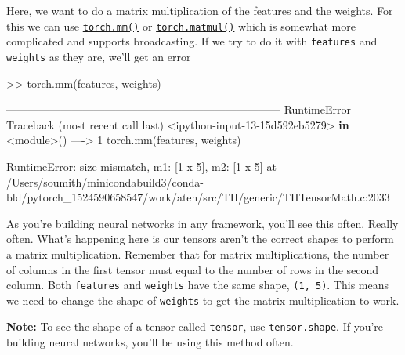 \documentclass[11pt]{article}
\newenvironment{Shaded}{}{}
\newcommand{\KeywordTok}[1]{\textcolor[rgb]{0.00,0.44,0.13}{\textbf{{#1}}}}
\newcommand{\DecValTok}[1]{\textcolor[rgb]{0.25,0.63,0.44}{{#1}}}
\newcommand{\NormalTok}[1]{{#1}}
\newcommand{\OperatorTok}[1]{\textcolor[rgb]{0.40,0.40,0.40}{{#1}}}
\newcommand{\BuiltInTok}[1]{{#1}}
\newcommand{\PreprocessorTok}[1]{\textcolor[rgb]{0.74,0.48,0.00}{{#1}}}
\begin{document}
Here, we want to do a matrix multiplication of the features and the
weights. For this we can use
\href{https://pytorch.org/docs/stable/torch.html\#torch.mm}{\texttt{torch.mm()}}
or
\href{https://pytorch.org/docs/stable/torch.html\#torch.matmul}{\texttt{torch.matmul()}}
which is somewhat more complicated and supports broadcasting. If we try
to do it with \texttt{features} and \texttt{weights} as they are, we'll
get an error

\begin{Shaded}
\begin{Highlighting}[]
\OperatorTok{>>}\NormalTok{ torch.mm(features, weights)}

\OperatorTok{---------------------------------------------------------------------------}
\PreprocessorTok{RuntimeError}\NormalTok{                              Traceback (most recent call last)}
\OperatorTok{<}\NormalTok{ipython}\OperatorTok{-}\BuiltInTok{input}\OperatorTok{-}\DecValTok{13}\OperatorTok{-}\NormalTok{15d592eb5279}\OperatorTok{>} \KeywordTok{in} \OperatorTok{<}\NormalTok{module}\OperatorTok{>}\NormalTok{()}
\OperatorTok{---->} \DecValTok{1}\NormalTok{ torch.mm(features, weights)}

\PreprocessorTok{RuntimeError}\NormalTok{: size mismatch, m1: [}\DecValTok{1}\NormalTok{ x }\DecValTok{5}\NormalTok{], m2: [}\DecValTok{1}\NormalTok{ x }\DecValTok{5}\NormalTok{] at }\OperatorTok{/}\NormalTok{Users}\OperatorTok{/}\NormalTok{soumith}\OperatorTok{/}\NormalTok{minicondabuild3}\OperatorTok{/}\NormalTok{conda}\OperatorTok{-}\NormalTok{bld}\OperatorTok{/}\NormalTok{pytorch_1524590658547}\OperatorTok{/}\NormalTok{work}\OperatorTok{/}\NormalTok{aten}\OperatorTok{/}\NormalTok{src}\OperatorTok{/}\NormalTok{TH}\OperatorTok{/}\NormalTok{generic}\OperatorTok{/}\NormalTok{THTensorMath.c:}\DecValTok{2033}
\end{Highlighting}
\end{Shaded}

As you're building neural networks in any framework, you'll see this
often. Really often. What's happening here is our tensors aren't the
correct shapes to perform a matrix multiplication. Remember that for
matrix multiplications, the number of columns in the first tensor must
equal to the number of rows in the second column. Both \texttt{features}
and \texttt{weights} have the same shape, \texttt{(1,\ 5)}. This means
we need to change the shape of \texttt{weights} to get the matrix
multiplication to work.

\textbf{Note:} To see the shape of a tensor called \texttt{tensor}, use
\texttt{tensor.shape}. If you're building neural networks, you'll be
using this method often.
\end{document}
